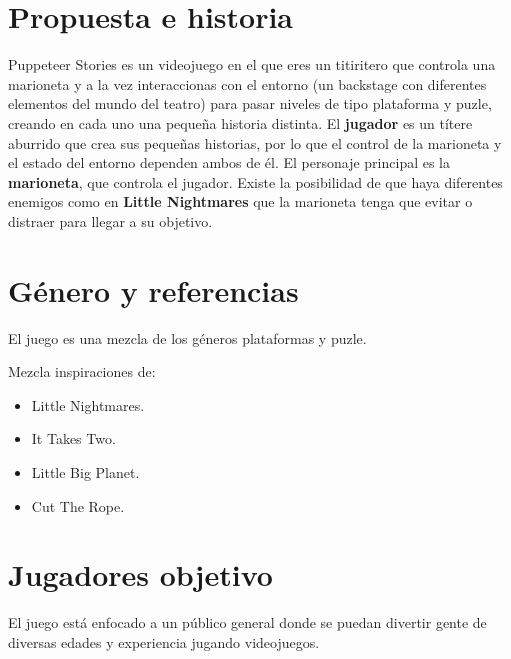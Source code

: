 \documentclass[12pt,twoside,letterpaper]{article}
\begin{document}



\newpage


\section{Propuesta e historia}

Puppeteer Stories es un videojuego en el que eres un titiritero que controla una marioneta y a la vez interaccionas con el entorno (un backstage con diferentes elementos del mundo del teatro) para pasar niveles de tipo plataforma y puzle, creando en cada uno una pequeña historia distinta.
El \textbf{jugador} es un títere aburrido que crea sus pequeñas historias, por lo que el control de la marioneta y el estado del entorno dependen ambos de él.
El personaje principal es la \textbf{marioneta}, que controla el jugador.
Existe la posibilidad de que haya diferentes enemigos como en \textbf{Little Nightmares} que la marioneta tenga que evitar o distraer para llegar a su objetivo.

\section{Género y referencias}

El juego es una mezcla de los géneros plataformas y puzle.

Mezcla inspiraciones de:
\begin{itemize}
    \item Little Nightmares.
    \item It Takes Two.
    \item Little Big Planet.
    \item Cut The Rope.
\end{itemize}

\section{Jugadores objetivo}

El juego está enfocado a un público general donde se puedan divertir gente de diversas edades y experiencia jugando videojuegos.
\end{document}
